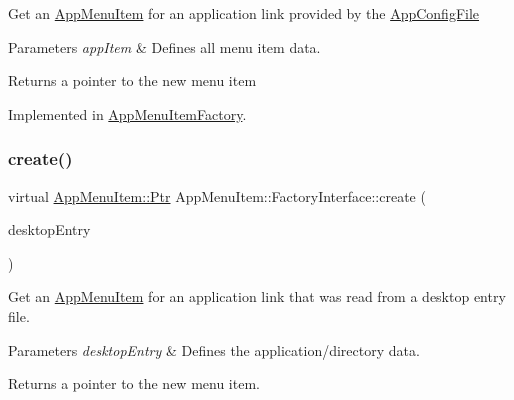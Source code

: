 Get an \mbox{\hyperlink{classAppMenuItem}{App\+Menu\+Item}} for an application link provided by the \mbox{\hyperlink{classAppConfigFile}{App\+Config\+File}}


\begin{DoxyParams}{Parameters}
{\em app\+Item} & Defines all menu item data.\\
\hline
\end{DoxyParams}
\begin{DoxyReturn}{Returns}
a pointer to the new menu item 
\end{DoxyReturn}


Implemented in \mbox{\hyperlink{classAppMenuItemFactory_a018510777d99cbda23a0aea41f90c4f9}{App\+Menu\+Item\+Factory}}.

\mbox{\label{classAppMenuItem_1_1FactoryInterface_ab4a62330cdbb3e4a0864f354ceb3396f}} 
\subsubsection{\texorpdfstring{create()}{create()}\hspace{0.1cm}{\footnotesize\ttfamily [2/3]}}
{\footnotesize\ttfamily virtual \mbox{\hyperlink{classAppMenuItem_ab5f51c5d74f8df62b8862c0cc8126cb7}{App\+Menu\+Item\+::\+Ptr}} App\+Menu\+Item\+::\+Factory\+Interface\+::create (\begin{DoxyParamCaption}\item[{const \mbox{\hyperlink{classDesktopEntry}{Desktop\+Entry}} \&}]{desktop\+Entry }\end{DoxyParamCaption})\hspace{0.3cm}{\ttfamily [pure virtual]}}

Get an \mbox{\hyperlink{classAppMenuItem}{App\+Menu\+Item}} for an application link that was read from a desktop entry file.


\begin{DoxyParams}{Parameters}
{\em desktop\+Entry} & Defines the application/directory data.\\
\hline
\end{DoxyParams}
\begin{DoxyReturn}{Returns}
a pointer to the new menu item. 
\end{DoxyReturn}


